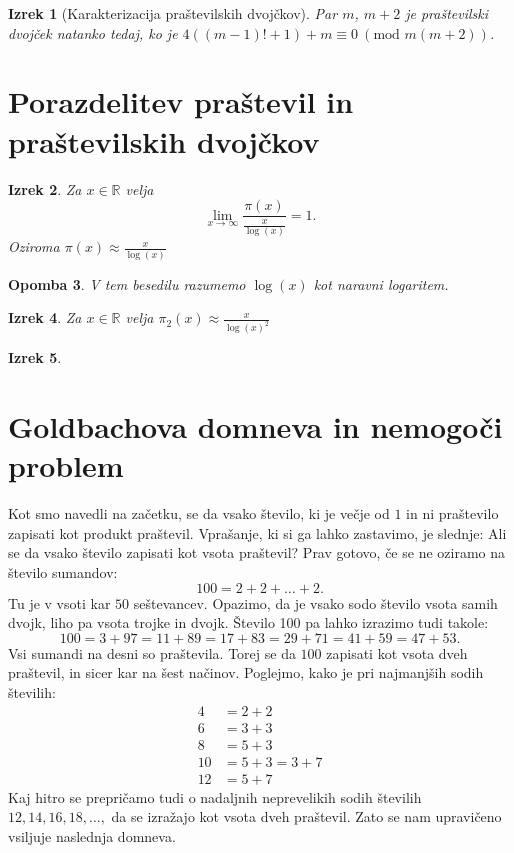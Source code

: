 \documentclass{amsart}
\newcommand{\RR}{\mathbb{R}}
\newtheorem{izrek}{Izrek}[section]
\newtheorem{opomba}[izrek]{Opomba}
\begin{document}
\begin{izrek}[Karakterizacija praštevilskih dvojčkov]
    Par $m$, $m+2$ je praštevilski dvojček natanko tedaj, ko je \(4\left((m-1)!+1\right)+m \equiv 0\ (\text{mod }m(m+2))\).
\end{izrek}

\newpage
\section{Porazdelitev praštevil in praštevilskih dvojčkov}

\begin{izrek}
    Za $x \in \RR$ velja $$\lim_{x \to \infty}\frac{\pi(x)}{\frac{x}{\log(x)}} = 1.$$ Oziroma $\pi(x) \approx \frac{x}{{\log(x)}}$
\end{izrek}

\begin{opomba}
    V tem besedilu razumemo $\log(x)$ kot naravni logaritem.
\end{opomba}

\begin{izrek}
    Za $x \in \RR$ velja $\pi_2(x) \approx \frac{x}{{\log(x)}^2}$
\end{izrek}

\begin{izrek}

\end{izrek}

\newpage
\section{Goldbachova domneva in nemogoči problem}

Kot smo navedli na začetku, se da vsako število, ki je večje od $1$ in ni praštevilo zapisati kot produkt praštevil. Vprašanje, ki 
si ga lahko zastavimo, je slednje: Ali se da vsako število zapisati kot vsota praštevil? Prav gotovo, če se ne  oziramo na število 
sumandov: $$100 = 2+ 2+ \ldots +2.$$ Tu je v vsoti kar $50$ seštevancev. Opazimo, da je vsako sodo število vsota samih dvojk, liho 
pa vsota trojke in dvojk. Število 100 pa lahko izrazimo tudi takole:
\[100=3+97=11+89=17+83=29+71=41+59=47+53.\]
Vsi sumandi na desni so praštevila. Torej se da $100$ zapisati kot vsota dveh praštevil, in sicer kar na šest načinov. Poglejmo, kako 
je pri najmanjših sodih številih:
\begin{align*}
    4 &= 2+2\\
    6 &= 3+3\\
    8 &= 5+3\\
    10 &= 5+3= 3+7\\
    12 &= 5+7
\end{align*}
Kaj hitro se prepričamo tudi o nadaljnih neprevelikih sodih številih $12, 14, 16, 18, \ldots,$ da se izražajo kot vsota dveh praštevil.
Zato se nam upravičeno vsiljuje naslednja domneva.
\end{document}
